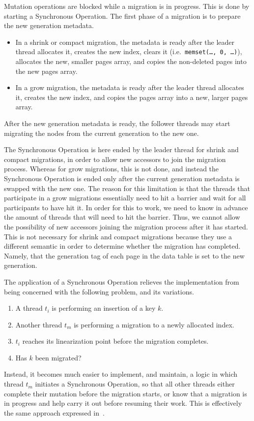Mutation operations are blocked while a migration is in progress.
This is done by starting a Synchronous Operation.
The first phase of a migration is to prepare the new generation metadata.
\begin{itemize}
	\item In a shrink or compact migration, the metadata is ready after the leader thread allocates it, creates the new index, clears it (i.e.\ \texttt{memset(\ldots, 0, \ldots)}), allocates the new, smaller pages array, and copies the non-deleted pages into the new pages array.
	\item In a grow migration, the metadata is ready after the leader thread allocates it, creates the new index, and copies the pages array into a new, larger pages array.
\end{itemize}
After the new generation metadata is ready, the follower threads may start migrating the nodes from the current generation to the new one.

The Synchronous Operation is here ended by the leader thread for shrink and compact migrations, in order to allow new accessors to join the migration process.
Whereas for grow migrations, this is not done, and instead the Synchronous Operation is ended only after the current generation metadata is swapped with the new one.
The reason for this limitation is that the threads that participate in a grow migrations essentially need to hit a barrier and wait for all participants to have hit it.
In order for this to work, we need to know in advance the amount of threads that will need to hit the barrier.
Thus, we cannot allow the possibility of new accessors joining the migration process after it has started.
This is not necessary for shrink and compact migrations because they use a different semantic in order to determine whether the migration has completed.
Namely, that the generation tag of each page in the data table is set to the new generation.

The application of a Synchronous Operation relieves the implementation from being concerned with the following problem, and its variations.
\begin{enumerate}
	\item A thread $t_i$ is performing an insertion of a key $k$.
	\item Another thread $t_m$ is performing a migration to a newly allocated index.
	\item $t_i$ reaches its linearization point before the migration completes.
	\item Has $k$ been migrated?
\end{enumerate}
Instead, it becomes much easier to implement, and maintain, a logic in which thread $t_m$ initiates a Synchronous Operation, so that all other threads either complete their mutation before the migration starts, or know that a migration is in progress and help carry it out before resuming their work.
This is effectively the same approach expressed in~\cite[\S5.3.2, Preventing Concurrent Updates to Ensure Consistency]{maier}.

